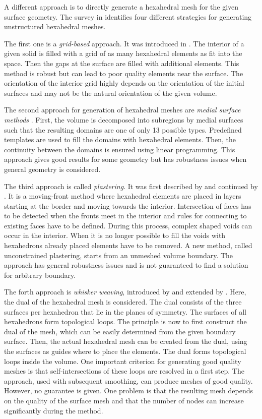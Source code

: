 A different approach is to directly generate a hexahedral mesh for the given surface geometry.
The survey in \cite{owen1998survey} identifies four different strategies for generating unstructured hexahedral meshes.

The first one is a \emph{grid-based} approach. It was introduced in \cite{schneiders1996grid,schneiders1997algorithm}. The interior of a given solid is filled with a grid of as many hexahedral elements as fit into the space. Then the gaps at the surface are filled with additional elements. This method is robust but can lead to poor quality elements near the surface. The orientation of the interior grid highly depends on the orientation of the initial surfaces and may not be the natural orientation of the given volume.

The second approach for generation of hexahedral meshes are \emph{medial surface methods} \cite{price1995hexahedral, price1997hexahedral}. First, the volume is decomposed into subregions by medial surfaces such that the resulting domains are one of only 13 possible types. Predefined templates are used to fill the domains with hexahedral elements. Then, the continuity between the domains is ensured using linear programming. This approach gives good results for some geometry but has robustness issues when general geometry is considered.

The third approach is called \emph{plastering}. It was first described by \cite{blacker1993seams} and continued by \cite{staten2006unconstrained,staten2010unconstrained}.
It is a moving-front method where hexahedral elements are placed in layers starting at the border and moving towards the interior. Intersection of faces has to be detected when the fronts meet in the interior and rules for connecting to existing faces have to be defined.
During this process, complex shaped voids can occur in the interior. When it is no longer possible to fill the voids with hexahedrons already placed elements have to be removed.
A new method, called unconstrained plastering, starts from an unmeshed volume boundary. The approach has general robustness issues and is not guaranteed to find a solution for arbitrary boundary.

The forth approach is \emph{whisker weaving}, introduced by \cite{tautges1996whisker} and extended by \cite{ledoux2008extension,kawamura2008strategy}. Here, the dual of the hexahedral mesh is considered. The dual consists of the three surfaces per hexahedron that lie in the planes of symmetry. The surfaces of all hexahedrons form topological loops. 
The principle is now to first construct the dual of the mesh, which can be easily determined from the given boundary surface. Then, the actual hexahedral mesh can be created from the dual, using the surfaces as guides where to place the elements.
The dual forms topological loops inside the volume. One important criterion for generating good quality meshes is that self-intersections of these loops are resolved in a first step.
The approach, used with subsequent smoothing, can produce meshes of good quality. However, no guarantee is given. One problem is that the resulting mesh depends on the quality of the surface mesh and that the number of nodes can increase significantly during the method.

